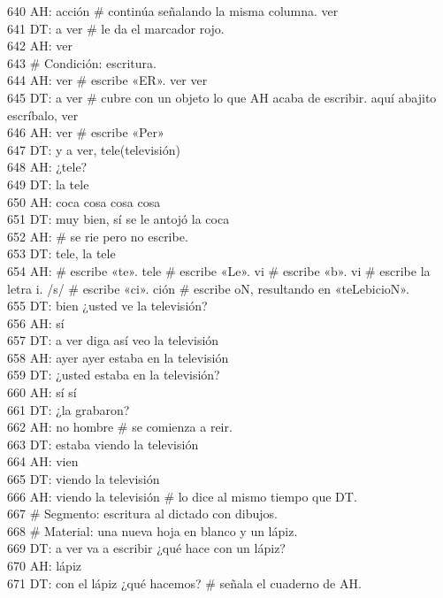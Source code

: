 640 AH: acción # continúa señalando la misma columna. ver\\
641 DT: a ver # le da el marcador rojo.\\
642 AH: ver\\
643 # Condición: escritura.\\
644 AH: ver # escribe «ER». ver ver \\
645 DT: a ver # cubre con un objeto lo que AH acaba de escribir. aquí abajito escríbalo, ver\\
646 AH: ver # escribe «Per»\\
647 DT: y a ver, tele(televisión)\\
648 AH: ¿tele?\\
649 DT: la tele\\
650 AH: coca cosa cosa cosa\\
651 DT: muy bien, sí se le antojó la coca\\
652 AH: # se rie pero no escribe.\\
653 DT: tele, la tele\\
654 AH: # escribe «te». tele # escribe «Le». vi # escribe «b». vi # escribe la letra i. /s/ # escribe «ci». ción # escribe oN, resultando en «teLebicioN».\\
655 DT: bien ¿usted ve la televisión?\\
656 AH: sí\\
657 DT: a ver diga así veo la televisión\\
658 AH: ayer ayer estaba en la televisión\\
659 DT: ¿usted estaba en la televisión?\\
660 AH: sí sí\\
661 DT: ¿la grabaron?\\
662 AH: no hombre # se comienza a reir.\\
663 DT: estaba viendo la televisión\\
664 AH: vien\\
665 DT: viendo la televisión\\
666 AH: viendo la televisión # lo dice al mismo tiempo que DT.\\
667 # Segmento: escritura al dictado con dibujos.\\
668 # Material: una nueva hoja en blanco y un lápiz.\\
669 DT: a ver va a escribir ¿qué hace con un lápiz?\\
670 AH: lápiz\\
671 DT: con el lápiz ¿qué hacemos? # señala el cuaderno de AH.\\
